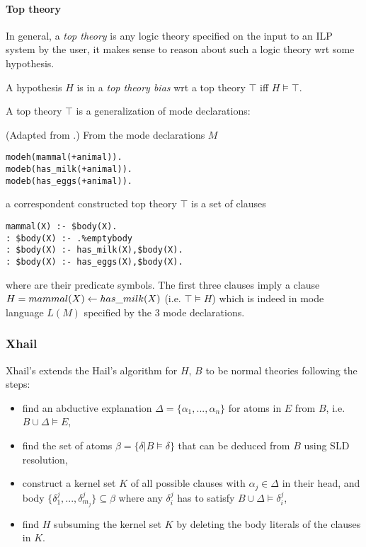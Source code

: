 \paragraph{Top theory\cite{muggleton2008toplog}}\label{top_theory}
In general, a \emph{top theory} is any logic theory specified on the input to an ILP system by the user, it makes sense to reason about such a logic theory wrt some hypothesis.
\begin{defn}\label{definition_top_theory_bias}
A hypothesis $H$ is in a \emph{top theory bias} wrt a top theory $\top$ iff $H \models \top$.
\end{defn}
A top theory $\top$ is a generalization of mode declarations:
\begin{exmp}(Adapted from \cite{muggleton2008toplog}.)
From the mode declarations $M$
\begin{lstlisting}
modeh(mammal(+animal)).
modeb(has_milk(+animal)).
modeb(has_eggs(+animal)).
\end{lstlisting}
a correspondent constructed top theory $\top$ is a set of clauses
\begin{lstlisting}
mammal(X) :- $body(X).
: $body(X) :- .%emptybody
: $body(X) :- has_milk(X),$body(X).
: $body(X) :- has_eggs(X),$body(X).
\end{lstlisting}
where  are their predicate symbols.
The first three clauses imply a clause $H=mammal(X) \leftarrow has\_milk(X)$ (i.e. $\top \models H$)
which is indeed in mode language $L(M)$ specified by the 3 mode declarations.
\end{exmp}

\subsubsection{Xhail\cite{kimber2012learning}\cite{ray2005phdHybrid}\cite{corapi2011nonmonotonic}}
Xhail's extends the Hail's algorithm for $H$, $B$ to be normal theories following the steps:
\begin{itemize}
\item find an abductive explanation $\Delta=\{\alpha_1, ..., \alpha_n\}$ for atoms in $E$ from $B$, i.e. $B \cup \Delta \models E$,
\item find the set of atoms $\beta=\{\delta | B \models \delta\}$ that can be deduced from $B$ using SLD resolution,
\item construct a kernel set $K$ of all possible clauses with $\alpha_j \in \Delta$ in their head, and body $\{\delta^j_1, ..., \delta^j_{m_j}\} \subseteq \beta$ where any $\delta^j_i$ has to satisfy $B \cup \Delta \models \delta^j_i$,
\item find $H$ subsuming the kernel set $K$ by deleting the body literals of the clauses in $K$.
\end{itemize}

